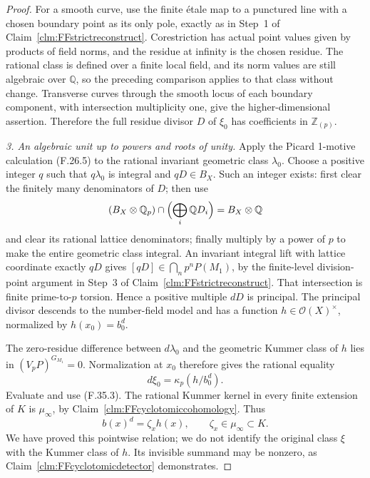 \documentclass[11pt]{article}
\begin{document}
\begin{proof}
For a smooth curve, use the finite \'etale map
to a punctured line with a chosen boundary
point as its only pole, exactly as in Step~1
of Claim~\ref{clm:FFstrictreconstruct}.
Corestriction has actual point values given by
products of field norms, and the residue at
infinity is the chosen residue. The rational
class is defined over a finite local field,
and its norm values are still algebraic over
\(\mathbb Q\), so the preceding comparison
applies to that class without change.
Transverse curves through the smooth locus
of each boundary component, with intersection
multiplicity one, give the higher-dimensional
assertion. Therefore the full residue divisor
\(D\) of \(\xi_0\) has coefficients in
\(\mathbb Z_{(p)}\).

\emph{3. An algebraic unit up to powers and roots of unity.}
Apply the Picard 1-motive calculation (F.26.5)
to the rational invariant geometric class
\(\lambda_0\). Choose a positive integer \(q\)
such that \(q\lambda_0\) is integral and
\(qD\in B_X\). Such an integer exists:
first clear the finitely many denominators
of \(D\); then use
\[
 (B_X\otimes\mathbb Q_p)\cap
       \Bigl(\bigoplus_i\mathbb QD_i\Bigr)
                         = B_X\otimes\mathbb Q
\]
and clear its rational lattice denominators;
finally multiply by a power of \(p\) to make
the entire geometric class integral.
An invariant integral lift with lattice
coordinate exactly \(qD\) gives
\([qD]\in\bigcap_n p^nP(M_1)\), by the
finite-level division-point argument in
Step~3 of Claim~\ref{clm:FFstrictreconstruct}.
That intersection is finite prime-to-\(p\)
torsion. Hence a positive multiple \(dD\)
is principal. The principal divisor descends
to the number-field model and has a function
\(h\in\mathcal O(X)^\times\), normalized by
\(h(x_0)=b_0^d\).

The zero-residue difference between
\(d\lambda_0\) and the geometric Kummer class
of \(h\) lies in \((V_pP)^{G_{M_1}}=0\).
Normalization at \(x_0\) therefore gives the
rational equality
\[
                   d\xi_0=\kappa_p(h/b_0^d).
                                                        \tag{F.35.6}
\]
Evaluate and use (F.35.3). The rational
Kummer kernel in every finite extension of
\(K\) is \(\mu_\infty\), by
Claim~\ref{clm:FFcyclotomiccohomology}. Thus
\[
                b(x)^d=\zeta_xh(x),
                         \qquad \zeta_x\in\mu_\infty\subset K.
                                                        \tag{F.35.7}
\]
We have proved this pointwise relation; we
do not identify the original class \(\xi\)
with the Kummer class of \(h\). Its invisible
summand may be nonzero, as Claim~\ref{clm:FFcyclotomicdetector}
demonstrates.


\end{proof}
\end{document}
